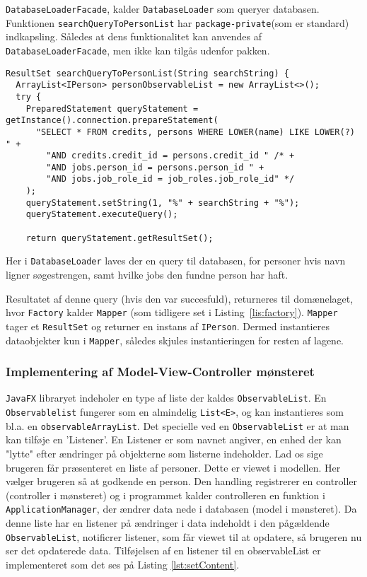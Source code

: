 \texttt{DatabaseLoaderFacade}, kalder \texttt{DatabaseLoader} som queryer
databasen. Funktionen \texttt{searchQueryToPersonList} har
\texttt{package-private}(som er standard) indkapsling. Således at dens
funktionalitet kan anvendes af \texttt{DatabaseLoaderFacade}, men ikke kan
tilgås udenfor pakken. 

\begin{lstlisting}[basicstyle=\ttfamily\footnotesize, firstnumber=42,
caption=Query af databasen for personer (\texttt{DatabaseLoader.java})]
ResultSet searchQueryToPersonList(String searchString) {
  ArrayList<IPerson> personObservableList = new ArrayList<>();
  try {
    PreparedStatement queryStatement = getInstance().connection.prepareStatement(
      "SELECT * FROM credits, persons WHERE LOWER(name) LIKE LOWER(?) " +
        "AND credits.credit_id = persons.credit_id " /* +
        "AND jobs.person_id = persons.person_id " +
        "AND jobs.job_role_id = job_roles.job_role_id" */
    );
    queryStatement.setString(1, "%" + searchString + "%");
    queryStatement.executeQuery();

    return queryStatement.getResultSet();
\end{lstlisting}

Her i \texttt{DatabaseLoader} laves der en query til databasen, for personer
hvis navn ligner søgestrengen, samt hvilke jobs den fundne person har haft.

Resultatet af denne query (hvis den var succesfuld), returneres til domænelaget,
hvor \texttt{Factory} kalder \texttt{Mapper} (som tidligere set i
Listing~\ref{lis:factory}). \texttt{Mapper} tager et \texttt{ResultSet} og
returner en instans af \texttt{IPerson}. Dermed instantieres dataobjekter kun i
\texttt{Mapper}, således skjules instantieringen for resten af lagene.

\subsubsection{Implementering af Model-View-Controller mønsteret} 
\texttt{JavaFX}
libraryet indeholer en type af liste der kaldes \texttt{ObservableList}.  En
\texttt{Observablelist} fungerer som en almindelig \texttt{List<E>}, og kan
instantieres som bl.a. en \texttt{observableArrayList}. Det specielle ved en
\texttt{ObservableList} er at man kan tilføje en 'Listener'. En Listener er som
navnet angiver, en enhed der kan "lytte" efter ændringer på objekterne som
listerne indeholder. Lad os sige brugeren får præsenteret en liste af personer.
Dette er viewet i modellen. Her vælger brugeren så at godkende en person. Den
handling registrerer en controller (controller i mønsteret) og i programmet
kalder controlleren en funktion i \texttt{ApplicationManager}, der ændrer 
data nede i databasen (model i mønsteret). Da denne liste har en listener på
ændringer i data indeholdt i den pågældende \texttt{ObservableList}, notificrer
listener, som får viewet til at opdatere, så brugeren nu ser det opdaterede
data.  Tilføjelsen af en listener til en observableList er implementeret som
det ses på Listing \ref{lst:setContent}.

